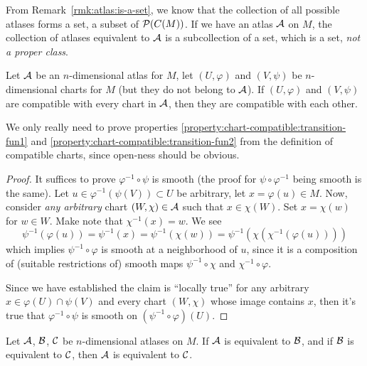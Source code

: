 \begin{remark}\label{rmk:atlas:equivalence-class-is-proper-set}
From Remark~\ref{rmk:atlas:is-a-set}, we know that the collection of all
possible atlases forms a set, a subset of $\mathcal{P}(C(M))$.
If we have an atlas $\mathcal{A}$ on $M$, the collection of atlases
equivalent to $\mathcal{A}$ is a subcollection of a set, which is a set,
\emph{not a proper class}.
\end{remark}

\begin{lemma}
Let $\mathcal{A}$ be an $n$-dimensional atlas for $M$, let $(U,\varphi)$ and $(V,\psi)$
be $n$-dimensional charts for $M$ (but they do not belong to $\mathcal{A}$).
If $(U,\varphi)$ and $(V,\psi)$ are compatible with every chart in $\mathcal{A}$,
then they are compatible with each other.
\end{lemma}

We only really need to prove properties
\ref{property:chart-compatible:transition-fun1} and
\ref{property:chart-compatible:transition-fun2} from the definition of
compatible charts, since open-ness should be obvious.

\begin{proof}
It suffices to prove $\varphi^{-1}\circ\psi$ is smooth (the proof for
$\psi\circ\varphi^{-1}$ being smooth is the same).
Let $u\in\varphi^{-1}(\psi(V))\subset U$ be arbitrary,
let $x=\varphi(u)\in M$.
Now, consider \emph{any arbitrary} chart $(W,\chi)\in\mathcal{A}$ such that $x\in\chi(W)$.
Set $x=\chi(w)$ for $w\in W$. Make note that $\chi^{-1}(x)=w$. We see
\begin{equation}
\psi^{-1}(\varphi(u)) = \psi^{-1}(x) = \psi^{-1}(\chi(w))=\psi^{-1}(\chi(\chi^{-1}(\varphi(u))))
\end{equation}
which implies $\psi^{-1}\circ\varphi$ is smooth at a neighborhood of $u$,
since it is a composition of (suitable restrictions of) smooth maps
$\psi^{-1}\circ\chi$ and $\chi^{-1}\circ\varphi$.

Since we have established the claim is ``locally true'' for any
arbitrary $x\in\varphi(U)\cap\psi(V)$ and every chart $(W,\chi)$ whose
image contains $x$, then it's true that $\varphi^{-1}\circ\psi$ is
smooth on $(\psi^{-1}\circ\varphi)(U)$.
\end{proof}

\begin{corollary}
Let $\mathcal{A}$, $\mathcal{B}$, $\mathcal{C}$ be $n$-dimensional
atlases on $M$. If $\mathcal{A}$ is equivalent to $\mathcal{B}$, and if
$\mathcal{B}$ is equivalent to $\mathcal{C}$, then $\mathcal{A}$ is
equivalent to $\mathcal{C}$.
\end{corollary}

